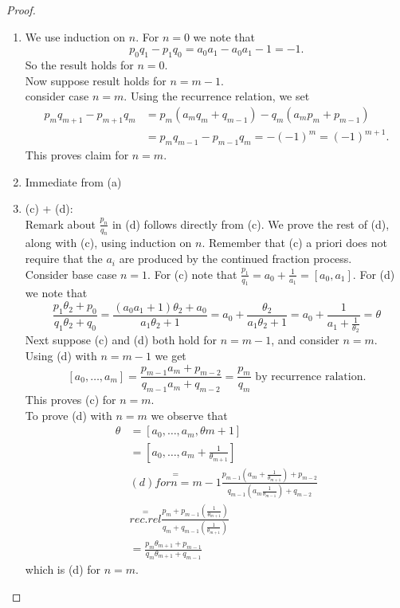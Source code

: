\documentclass[NumTh.tex]{subfiles}
\begin{document}
\begin{proof}
  \begin{enumerate} %
    \item We use induction on $n$. For $n = 0$ we note that 
    \[ p_0 q_1 - p_1 q_0 = a_0 a_1 - a_0 a_1 - 1 = -1.\]
    So the result holds for $n = 0$.\\
    Now suppose result holds for $n = m - 1$.\\
    consider case $n = m$. Using the recurrence relation, we set
    \begin{align}
      p_m q_{m+1} - p_{m+1} q_m &= p_m (a_m q_m + q_{m-1}) - q_m ( a_m p_m + p_{m-1})\\
      &= p_m q_{m-1} - p_{m-1}q_m = - (-1)^m = (-1)^{m+1}.
    \end{align}
    This proves claim for $n = m$.
    \item Immediate from (a)
    \item (c) + (d):\\
    Remark about $\frac{p_n}{q_n}$ in (d) follows directly from (c).
    We prove the rest of (d), along with (c), using induction on $n$. Remember that (c) a priori does not require that the $a_i$ are produced by the continued fraction process.\\
    Consider base case $n = 1$. For (c) note that $\frac{p_1}{q_1} = a_0 + \frac{1}{a_1} = [a_0,a_1]$.
    For (d) we note that
    \[ \frac{p_1 \theta_2 + p_0}{q_1 \theta_2 + q_0} = \frac{(a_0 a_1 +1) \theta_2 + a_0}{a_1 \theta_2 + 1} = a_0 + \frac{\theta_2}{a_1 \theta_2 +1} = a_0 + \frac{1}{a_1 + \frac{1}{\theta_2}} = \theta \]
    Next suppose (c) and (d) both hold for $n = m-1$, and consider $n = m$. Using (d)  with $n = m -1$ we get
    \[ [a_0, \dots, a_m ] = \frac{p_{m-1} a_m + p_{m-2}}{q_{m-1} a_m + q_{m-2}} = \frac{p_m}{q_m} \text{ by recurrence ralation.} \]
    This proves (c) for $n=m$.\\
    To prove (d) with $n=m$ we observe that
    \begin{align}
      \theta &= [a_0,\dots,a_m,\theta{m+1} ] \\
      &= [a_0,\dots,a_m + \frac{1}{\theta_{m+1}} ]\\
      &\overset{=}{(d) for n=m-1} \frac{p_{m-1} (a_m + \frac{1}{\theta_{m+1}} ) + p_{m-2}}{q_{m-1} (a_m \frac{1}{\theta_{m-1}} ) + q_{m-2}}\\
      &\overset{=}{rec. rel} \frac{p_m + p_{m-1} (\frac{1}{\theta_{m+1}})}{q_m + q_{m-1} ( \frac{1}{\theta_{m+1}})}\\
      &= \frac{p_m \theta_{m+1} + p_{m-1}}{q_m \theta_{m+1} + q_{m-1}}
    \end{align}
    which is (d) for $n=m$.
  \end{enumerate}
\end{proof}
\end{document}
